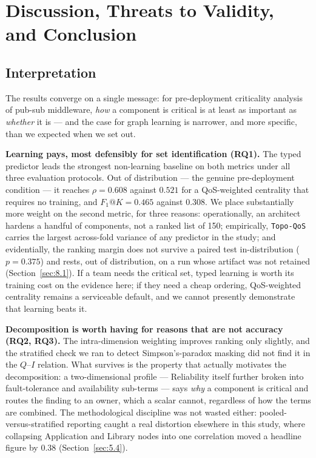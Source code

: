 \hypertarget{discussion-threats-to-validity-and-conclusion}{%
\section{Discussion, Threats to Validity, and Conclusion}\label{discussion-threats-to-validity-and-conclusion}}

\label{sec:9}

\hypertarget{interpretation}{%
\subsection{Interpretation}\label{interpretation}}

\label{sec:9.1}

The results converge on a single message: for pre-deployment criticality analysis of pub-sub
middleware, \emph{how} a component is critical is at least as important as \emph{whether} it is ---
and the case for graph learning is narrower, and more specific, than we expected when we set out.

\textbf{Learning pays, most defensibly for set identification (RQ1).} The typed predictor leads the
strongest non-learning baseline on both metrics under all three evaluation protocols. Out of
distribution --- the genuine pre-deployment condition --- it reaches \(\rho=0.608\) against \(0.521\)
for a QoS-weighted centrality that requires no training, and \(F_1@K=0.465\) against \(0.308\). We
place substantially more weight on the second metric, for three reasons: operationally, an architect
hardens a handful of components, not a ranked list of 150; empirically, \texttt{Topo-QoS} carries the
largest across-fold variance of any predictor in the study; and evidentially, the ranking margin does
not survive a paired test in-distribution (\(p=0.375\)) and rests, out of distribution, on a run whose
artifact was not retained (Section~\ref{sec:8.1}). If a team needs the critical set, typed learning is
worth its training cost on the evidence here; if they need a cheap ordering, QoS-weighted centrality
remains a serviceable default, and we cannot presently demonstrate that learning beats it.

\textbf{Decomposition is worth having for reasons that are not accuracy (RQ2, RQ3).} The
intra-dimension weighting improves ranking only slightly, and the stratified check we ran to detect
Simpson's-paradox masking did not find it in the \(Q\)--\(I\) relation. What survives is the property
that actually motivates the decomposition: a two-dimensional profile --- Reliability itself further
broken into fault-tolerance and availability sub-terms --- says \emph{why} a component is critical and
routes the finding to an owner, which a scalar cannot, regardless of how the terms are combined. The
methodological discipline was not wasted either: pooled-versus-stratified reporting caught a real
distortion elsewhere in this study, where collapsing Application and Library nodes into one
correlation moved a headline figure by 0.38 (Section~\ref{sec:5.4}).

